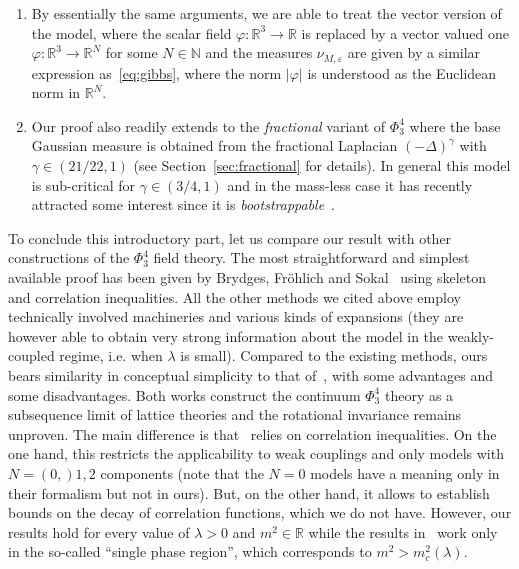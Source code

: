 \documentclass[a4paper,11pt]{article}
\numberwithin{equation}{section}
\begin{document}
\begin{remark}
\begin{enumerate}
    \item By essentially the same arguments, we are able to treat the vector
    version of the model, where the scalar field $\varphi : \mathbb{R}^3
    \rightarrow \mathbb{R}$ is replaced by a vector valued one $\varphi :
    \mathbb{R}^3 \rightarrow \mathbb{R}^N$ for some $N \in \mathbb{N}$ and the
    measures $\nu_{M, \varepsilon}$ are given by a similar expression
    as~{\eqref{eq:gibbs}}, where the norm $| \varphi |$ is understood as the
    Euclidean norm in $\mathbb{R}^N$.
    
    
    \item Our proof also readily extends to the \emph{fractional} variant of $\Phi^4_3$ where
     the base Gaussian measure is obtained from the fractional Laplacian $(-\Delta)^\gamma$ with $\gamma\in(21/22,1)$ (see Section~\ref{sec:fractional} for details). In general this model is sub-critical for $\gamma\in(3/4,1)$ and in the mass-less case 
     it has recently attracted some interest since  it is \emph{bootstrappable}~\cite{poland_conformal_2019, behan_bootstrapping_2019}. 
     
  \end{enumerate}
\end{remark}

To conclude this introductory part, let us compare our result with other
constructions of the $\Phi^4_3$ field theory. The most straightforward and
simplest available proof has been given by Brydges, Fr{\"o}hlich and
Sokal~{\cite{MR723546}} using skeleton  and correlation inequalities.
All the other methods we cited above employ technically involved machineries
and various kinds of expansions (they are however able to obtain very strong
information about the model in the weakly-coupled regime, i.e. when $\lambda$ is small). Compared to the
existing methods, ours bears similarity in conceptual simplicity to that
of~{\cite{MR723546}}, with some advantages and some disadvantages. Both works
construct the continuum $\Phi^4_3$ theory as a subsequence limit of lattice
theories and the rotational invariance remains unproven. The main difference
is that~{\cite{MR723546}} relies on correlation inequalities. On the
one hand, this restricts the applicability to weak couplings and only models with
$N = (0,) 1, 2$ components (note that the $N=0$ models have a meaning only in their formalism but not in ours). But, on the other hand, it allows to establish bounds
on the decay of correlation functions, which we do not have. However, our results hold for every
value of $\lambda > 0$ and $m^2 \in \mathbb{R}$ while the results
in~{\cite{MR723546}} work only in the so-called ``single phase region'',
which  corresponds to  $m^2>m_{c}^{2}(\lambda)$.
\end{document}
